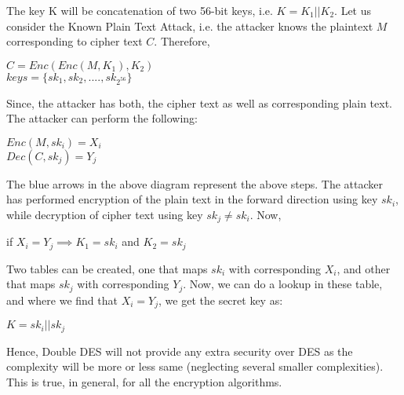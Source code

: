 \documentclass[11pt]{article}
\begin{document}
\begin{center}
\end{center}
The key K will be concatenation of two 56-bit keys, i.e. $K = K_1 || K_2$. Let us consider the Known Plain Text Attack, i.e. the attacker knows the plaintext $M$ corresponding to cipher text $C$.
Therefore, 
\begin{center}
    $C = Enc(Enc(M, K_1), K_2)$\\
    \vspace{1mm}
    $keys = \{sk_1, sk_2,...., sk_{2^{56}}\}$
\end{center}
Since, the attacker has both, the cipher text as well as corresponding plain text. The attacker can perform the following:
\begin{center}
    $Enc(M, sk_i) = X_i$\\
    $Dec(C, sk_j) = Y_j$\\
\end{center}
The blue arrows in the above diagram represent the above steps. The attacker has performed encryption of the plain text in the forward direction using key $sk_i$, while decryption of cipher text using key $sk_j \neq sk_i$. Now,
\begin{center}
    if $X_i = Y_j \implies K_1 = sk_i$ and $K_2 = sk_j$
\end{center}
Two tables can be created, one that maps $sk_i$ with corresponding $X_i$, and other that maps $sk_j$ with corresponding $Y_j$. Now, we can do a lookup in these table, and where we find that $X_i = Y_j$, we get the secret key as:
\begin{center}
    $K = sk_i || sk_j$
\end{center}
Hence, Double DES will not provide any extra security over DES as the complexity will be more or less same (neglecting several smaller complexities). This is true, in general, for all the encryption algorithms.
\end{document}
